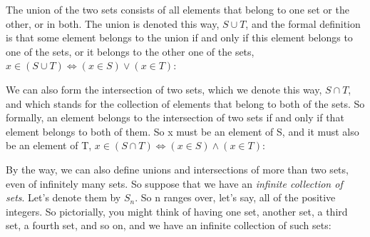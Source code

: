 \documentclass[pdftex, brazil, 12pt, twoside]{article}
\begin{document}
The union
of the two sets consists of all elements that belong to
one set or the other, or in both.
The union is denoted this way, $S \cup T$, and the formal definition is
that some element belongs to the union if and only if this
element belongs to one of the sets, or it belongs to the
other one of the sets, $x \in (S \cup T) \iff (x \in S) \vee (x \in T)$:

\begin{figure}[H]
  \begin{center}
  \end{center}
\end{figure}

We can also form the intersection of two sets,
which we denote this way, $S \cap T$, and which stands for the
collection of elements that belong to both of the sets.
So formally, an element belongs to the intersection of
two sets if and only if that element
belongs to both of them.
So x must be an element of S, and it must also be an element
of T, $x \in (S \cap T) \iff (x \in S) \wedge (x \in T)$:

\begin{figure}[H]
  \begin{center}
  \end{center}
\end{figure}

By the way, we can also define unions and intersections of
more than two sets, even of infinitely many sets.
So suppose that we have an \emph{infinite collection of sets}.
Let's denote them by $S_n$.
So n ranges over, let's say, all of the positive integers.
So pictorially, you might think of having one set,
another set, a third set, a fourth set, and so on, and we
have an infinite collection of such sets:

\begin{figure}[H]
  \begin{center}
  \end{center}
\end{figure}
\end{document}
